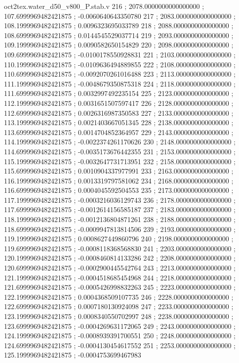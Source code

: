 \begin{filecontents}[overwrite]{oct2tex.water_d50_v800_P.stab.v}
216 ; 2078.0000000000000000 ; 107.6999969482421875 ; -0.0060640643350780
217 ; 2083.0000000000000000 ; 108.1999969482421875 ; 0.0096323695033789
218 ; 2088.0000000000000000 ; 108.6999969482421875 ; 0.0144545529037714
219 ; 2093.0000000000000000 ; 109.1999969482421875 ; 0.0090582650154829
220 ; 2098.0000000000000000 ; 109.6999969482421875 ; -0.0100178550928831
221 ; 2103.0000000000000000 ; 110.1999969482421875 ; -0.0109636494889855
222 ; 2108.0000000000000000 ; 110.6999969482421875 ; -0.0092070261016488
223 ; 2113.0000000000000000 ; 111.1999969482421875 ; -0.0048679350875318
224 ; 2118.0000000000000000 ; 111.6999969482421875 ; 0.0032997492235154
225 ; 2123.0000000000000000 ; 112.1999969482421875 ; 0.0031651507597417
226 ; 2128.0000000000000000 ; 112.6999969482421875 ; 0.0026316987350583
227 ; 2133.0000000000000000 ; 113.1999969482421875 ; 0.0021403667051345
228 ; 2138.0000000000000000 ; 113.6999969482421875 ; 0.0014704852364957
229 ; 2143.0000000000000000 ; 114.1999969482421875 ; -0.0022374261170626
230 ; 2148.0000000000000000 ; 114.6999969482421875 ; -0.0035173676442355
231 ; 2153.0000000000000000 ; 115.1999969482421875 ; -0.0032647731713951
232 ; 2158.0000000000000000 ; 115.6999969482421875 ; 0.0010904337977991
233 ; 2163.0000000000000000 ; 116.1999969482421875 ; 0.0013319797581062
234 ; 2168.0000000000000000 ; 116.6999969482421875 ; 0.0004045592504553
235 ; 2173.0000000000000000 ; 117.1999969482421875 ; -0.0003216036129743
236 ; 2178.0000000000000000 ; 117.6999969482421875 ; -0.0012614156585187
237 ; 2183.0000000000000000 ; 118.1999969482421875 ; -0.0012136804871261
238 ; 2188.0000000000000000 ; 118.6999969482421875 ; -0.0009947813814506
239 ; 2193.0000000000000000 ; 119.1999969482421875 ; 0.0008627449860796
240 ; 2198.0000000000000000 ; 119.6999969482421875 ; -0.0008118368568830
241 ; 2203.0000000000000000 ; 120.1999969482421875 ; -0.0008460814133286
242 ; 2208.0000000000000000 ; 120.6999969482421875 ; -0.0002900445542764
243 ; 2213.0000000000000000 ; 121.1999969482421875 ; -0.0004518685454968
244 ; 2218.0000000000000000 ; 121.6999969482421875 ; -0.0005426998832263
245 ; 2223.0000000000000000 ; 122.1999969482421875 ; 0.0004368509107735
246 ; 2228.0000000000000000 ; 122.6999969482421875 ; 0.0007180130924098
247 ; 2233.0000000000000000 ; 123.1999969482421875 ; 0.0008340550702997
248 ; 2238.0000000000000000 ; 123.6999969482421875 ; -0.0004269631172065
249 ; 2243.0000000000000000 ; 124.1999969482421875 ; -0.0008939391700551
250 ; 2248.0000000000000000 ; 124.6999969482421875 ; -0.0004130454617552
251 ; 2253.0000000000000000 ; 125.1999969482421875 ; -0.0004753699467983

\end{filecontents}
